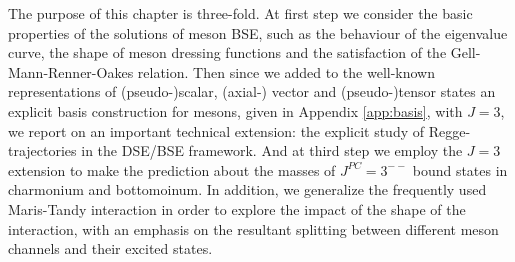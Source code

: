 The purpose of this chapter is three-fold. At first step we consider the basic properties of the solutions of meson BSE, such as the behaviour of the eigenvalue curve, the shape of meson dressing functions and the satisfaction of the Gell-Mann-Renner-Oakes relation. 
Then since we added to the well-known representations of (pseudo-)scalar, {(axial-)} vector and (pseudo-)tensor states 
\cite{Joos:1962qq,Weinberg:1964cn,Zemach:1968zz,Krassnigg:2010mh} an explicit basis construction for mesons, given in Appendix \ref{app:basis}, with $J=3$, we report on an important technical extension: the explicit study of Regge-trajectories in the DSE/BSE framework. And at third step we employ the $J=3$ extension to make the prediction about the masses of $J^{PC}=3^{--}$ bound states in charmonium and bottomoinum. In addition, we generalize the frequently used Maris-Tandy interaction in order to explore the impact of the shape of the interaction, with an emphasis on the resultant splitting between different meson channels and their excited states. 

